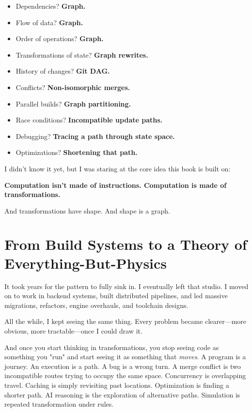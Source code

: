 \begin{itemize}
    \item Dependencies? \textbf{Graph.}
    \item Flow of data? \textbf{Graph.}
    \item Order of operations? \textbf{Graph.}
    \item Transformations of state? \textbf{Graph rewrites.}
    \item History of changes? \textbf{Git DAG.}
    \item Conflicts? \textbf{Non-isomorphic merges.}
    \item Parallel builds? \textbf{Graph partitioning.}
    \item Race conditions? \textbf{Incompatible update paths.}
    \item Debugging? \textbf{Tracing a path through state space.}
    \item Optimizations? \textbf{Shortening that path.}
\end{itemize}

I didn't know it yet, but I was staring at the core idea this book is built on:

\textbf{Computation isn't made of instructions. Computation is made of transformations.}

And transformations have shape. And shape is a graph.

\section{From Build Systems to a Theory of Everything-But-Physics}
\label{sec:theory-of-everything}

It took years for the pattern to fully sink in. I eventually left that studio. I moved on to work in backend systems, built distributed pipelines, and led massive migrations, refactors, engine overhauls, and toolchain designs.

All the while, I kept seeing the same thing. Every problem became clearer—more obvious, more tractable—once I could draw it.

And once you start thinking in transformations, you stop seeing code as something you "run" and start seeing it as something that \textit{moves}. A program is a journey. An execution is a path. A bug is a wrong turn. A merge conflict is two incompatible routes trying to occupy the same space. Concurrency is overlapping travel. Caching is simply revisiting past locations. Optimization is finding a shorter path. AI reasoning is the exploration of alternative paths. Simulation is repeated transformation under rules.

